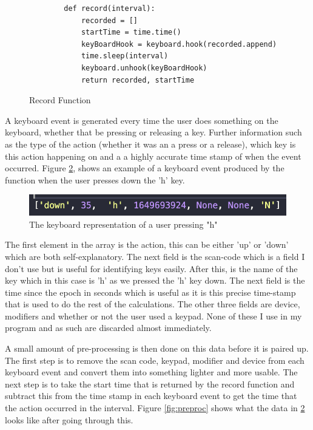 \documentclass[10pt,a4paper]{report}
\begin{document}
\begin{figure}[h!]
	\begin{lstlisting}
		def record(interval):
    		recorded = []
    		startTime = time.time()
    		keyBoardHook = keyboard.hook(recorded.append)
    		time.sleep(interval)
    		keyboard.unhook(keyBoardHook)
    		return recorded, startTime
	\end{lstlisting}
	\caption{Record Function}
	\label{fig:Record}
\end{figure}

A keyboard event is generated every time the user does something on the keyboard, whether that be pressing or releasing a key. Further information such as the type of the action (whether it was an a press or a release), which key is this action happening on and a a highly accurate time stamp of when the event occurred. Figure \ref{fig:Hook}, shows an example of a keyboard event produced by the function when the user presses down the 'h' key.

\begin{figure}[h]
\centering
\includegraphics[scale=0.97]{KeyboardEvent}
\caption{The keyboard representation of a user pressing "h"}
\label{fig:Hook}
\end{figure}

The first element in the array is the action, this can be either 'up' or 'down' which are both self-explanatory. The next field is the scan-code which is a field I don't use but is useful for identifying keys easily. After this, is the name of the key which in this case is 'h' as we pressed the 'h' key down. The next field is the time since the epoch in seconds which is useful as it is this precise time-stamp that is used to do the rest of the calculations. The other three fields are device, modifiers and whether or not the user used a keypad. None of these I use in my program and as such are discarded almost immediately.

A small amount of pre-processing is then done on this data before it is paired up. The first step is to remove the scan code, keypad, modifier and device from each keyboard event and convert them into something lighter and more usable. The next step is to take the start time that is returned by the record function and subtract this from the time stamp in each keyboard event to get the time that the action occurred in the interval. Figure \ref{fig:preproc} shows what the data in \ref{fig:Hook} looks like after going through this.
\end{document}
